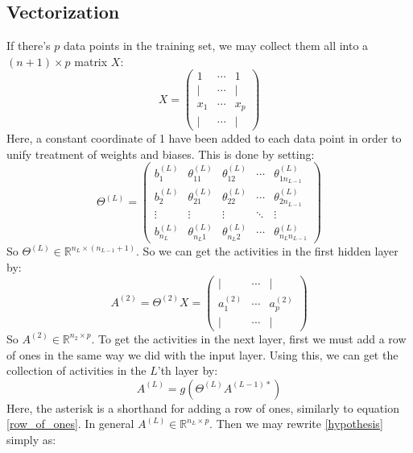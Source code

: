 \documentclass[12pt, a4paper]{article}
\numberwithin{equation}{section}
\begin{document}
\subsection{Vectorization}
If there's $p$ data points in the training set, we may collect them all into a $(n+1)\times p$ matrix $X$:
\begin{equation}
\label{row_of_ones}
X=
\begin{pmatrix}
1	&	\cdots	& 1	\\
|	&	\cdots	& |	\\
x_1	&	\cdots	& x_p \\
|	&	\cdots	& |
\end{pmatrix}
\end{equation}
Here, a constant coordinate of 1 have been added to each data point in order to unify treatment of weights and biases. This is done by setting:
\begin{equation}
\Theta^{(L)}=
\begin{pmatrix}
b^{(L)}_1		& \theta^{(L)}_{11}	& \theta^{(L)}_{12}	& \cdots	& \theta^{(L)}_{1n_{L-1}} \\
b^{(L)}_2		& \theta^{(L)}_{21}	& \theta^{(L)}_{22}	& \cdots 	& \theta^{(L)}_{2n_{L-1}} \\
\vdots			& \vdots		& \vdots		& \ddots 	& \vdots \\
b^{(L)}_{n_L}	& \theta^{(L)}_{n_L1}	& \theta^{(L)}_{n_L2}	& \cdots	& \theta^{(L)}_{n_Ln_{L-1}}
\end{pmatrix}
\end{equation}
So $\Theta^{(L)}\in\mathbb{R}^{n_L\times(n_{L-1}+1)}$. So we can get the activities in the first hidden layer by:
\begin{equation}
A^{(2)}=\Theta^{(2)}X=
\begin{pmatrix}
| & \cdots & | \\
a^{(2)}_1 & \cdots & a^{(2)}_p \\
| & \cdots & | 
\end{pmatrix}
\end{equation}
So $A^{(2)}\in\mathbb{R}^{n_2\times p}$. To get the activities in the next layer, first we must add a row of ones in the same way we did with the input layer. Using this, we can get the collection of activities in the $L$'th layer by:
\begin{equation}
A^{(L)}=g(\Theta^{(L)}A^{(L-1)*})
\end{equation}
Here, the asterisk is a shorthand for adding a row of ones, similarly to equation \ref{row_of_ones}. In general $A^{(L)}\in\mathbb{R}^{n_L\times p}$. Then we may rewrite \ref{hypothesis} simply as:
\end{document}
